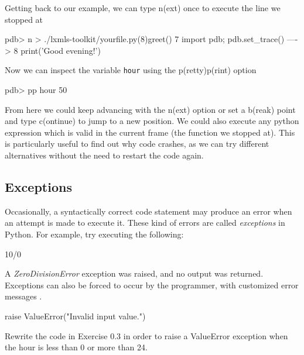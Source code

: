 \noindent Getting back to our example, we can type n(ext) once to execute the line we
stopped at

\begin{python}
pdb> n
> ./lxmls-toolkit/yourfile.py(8)greet()
      7                 import pdb; pdb.set_trace()
----> 8                 print('Good evening!') 
\end{python}

\noindent Now we can inspect the variable \texttt{hour} using the p(retty)p(rint) option

\begin{python}
pdb> pp hour
50
\end{python}

From here we could keep advancing with the n(ext) option or set a b(reak) point
and type c(ontinue) to jump to a new position. We could also execute any python
expression which is valid in the current frame (the function we stopped at).
This is particularly useful to find out why code crashes, as we can try
different alternatives without the need to restart the code again.

\subsection{Exceptions}

Occasionally, a syntactically correct code statement may produce an error when
an attempt is made to execute it. These kind of errors are called
\textit{exceptions} in Python. For example, try executing the following:

\begin{python}
10/0
\end{python}

A \textit{ZeroDivisionError} exception was raised, and no output was returned.
Exceptions can also be forced to occur by the programmer, with customized error
messages \footnotemark{}.

\begin{python}
raise ValueError("Invalid input value.")
\end{python}

\begin{exercise}
Rewrite the code in Exercise 0.3 in order to raise a ValueError exception when
the hour is less than 0 or more than 24.  \end{exercise}

